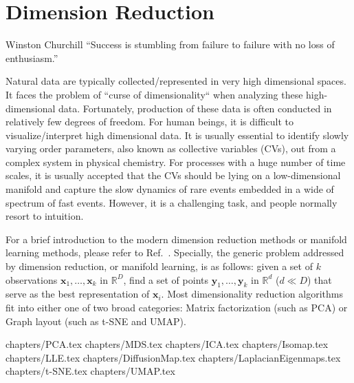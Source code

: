 \chapter{Dimension Reduction\label{chapter:DR}}
\begin{chapquote}{Winston Churchill%
	}
	``Success is stumbling from failure to failure with no loss of enthusiasm.''
\end{chapquote}
Natural data are typically collected/represented in very high dimensional spaces. It faces the problem of ``curse of dimensionality`` when analyzing these high-dimensional data. Fortunately, production of these data is often conducted in relatively few degrees of freedom. For human beings, it is difficult to visualize/interpret high dimensional data. It is usually essential to identify slowly varying order parameters, also known as collective variables (CVs), out from a complex system in physical chemistry. For processes with a huge number of time scales, it is usually accepted that the CVs should be lying on a low-dimensional manifold and capture the slow dynamics of rare events embedded in a wide of spectrum of fast events. However, it is a challenging task, and people normally resort to intuition.

For a brief introduction to the modern dimension reduction methods or manifold learning methods, please refer to Ref.~\cite{IzamanWIREsCS2012}. Specially, the generic problem addressed by dimension reduction, or manifold learning, is as follows: given a set of $k$ observations $\mathbf{x}_1,\dots,\mathbf{x}_k$ in $\mathbb{R}^D$, find a set of points $\mathbf{y}_1,\dots,\mathbf{y}_k$ in $\mathbb{R}^d$ ($d\ll D$) that serve as the best representation of $\mathbf{x}_i$. Most dimensionality reduction algorithms fit into either one of two broad categories: Matrix factorization (such as PCA) or Graph layout (such as t-SNE and UMAP).

\clearpage 
 {chapters/PCA.tex}
\clearpage
 {chapters/MDS.tex}
\clearpage
 {chapters/ICA.tex}
\clearpage
 {chapters/Isomap.tex}
\clearpage
 {chapters/LLE.tex}
\clearpage
 {chapters/DiffusionMap.tex}
\clearpage
 {chapters/LaplacianEigenmaps.tex}
\clearpage
 {chapters/t-SNE.tex}
\clearpage
 {chapters/UMAP.tex}